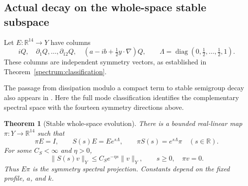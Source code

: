 \documentclass[11pt]{article}
\numberwithin{equation}{section}
\newtheorem{theorem}{Theorem}[section]
\theoremstyle{definition}
\theoremstyle{remark}
\begin{document}
\subsection{Actual decay on the whole-space stable subspace}

Let $E:\mathbb R^{14}\to Y$ have columns
\begin{equation}\label{lin:E}
 iQ,\quad \partial_1Q,\ldots,\partial_{12}Q,\quad
 (a-ib+\tfrac12y\cdot\nabla)Q,
 \qquad
 \Lambda=\operatorname{diag}(0,\tfrac12,\ldots,\tfrac12,1).
\end{equation}
These columns are independent symmetry vectors, as established in
Theorem~\ref{spectrum:classification}.

The passage from dissipation modulo a compact term to stable semigroup
decay also appears in \cite[Section~4.2]{BuckEtAl2026}. Here the full
mode classification identifies the complementary spectral space with
the fourteen symmetry directions above.

\begin{theorem}[Stable whole-space evolution]\label{linear:decay}
There is a bounded real-linear map $\pi:Y\to\mathbb R^{14}$ such that
\begin{equation}\label{lin:spectral-coordinates}
 \pi E=I,\qquad S(s)E=Ee^{s\Lambda},\qquad
 \pi S(s)=e^{s\Lambda}\pi\quad(s\in\mathbb R).
\end{equation}
For some $C_S<\infty$ and $\eta>0$,
\begin{equation}\label{lin:stable-decay}
 \|S(s)v\|_Y\le C_Se^{-\eta s}\|v\|_Y,
 \qquad s\ge0,\quad \pi v=0.
\end{equation}
Thus $E\pi$ is the symmetry spectral projection.  Constants depend on
the fixed profile, $a$, and $k$.
\end{theorem}
\end{document}
